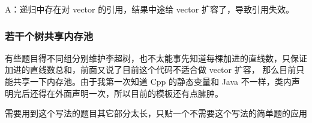 A：递归中存在对 vector 的引用，结果中途给 vector 扩容了，导致引用失效。

\subsubsection{若干个树共享内存池}

有些题目得不同组分别维护李超树，也不太能事先知道每棵加进的直线数，只保证加进的直线数总和，前面又说了目前这个代码不适合做 vector 扩容，
那么目前只能共享一下内存池。由于我第一次知道 Cpp 的静态变量和 Java 不一样，类内声明完后还得在外面声明一次，所以目前的模板还有点臃肿。

需要用到这个写法的题目其它部分太长，只贴一个不需要这个写法的简单题的应用 



